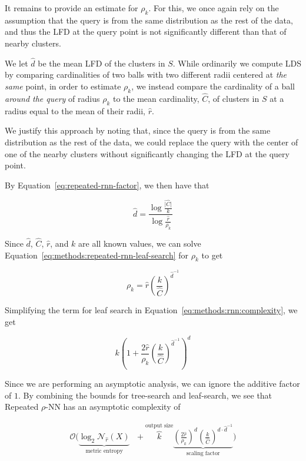 It remains to provide an estimate for $\rho_k$. 
For this, we once again rely on the assumption that the query is from the same distribution as the rest of the data, and thus the LFD at the query point is not significantly different than that of nearby clusters.

We let $\hat{d}$ be the mean LFD of the clusters in $S$.
While ordinarily we compute LDS by comparing cardinalities of two balls with two different radii centered at \emph{the same} point, in order to estimate $\rho_k$, we instead compare the cardinality of a ball \emph{around the query} of radius $\rho_k$ to the mean cardinality, $\hat{C}$, of clusters in $S$ at a radius equal to the mean of their radii, $\hat{r}$.

We justify this approach by noting that, since the query is from the same distribution as the rest of the data, we could replace the query with the center of one of the nearby clusters without significantly changing the LFD at the query point.

By Equation~\ref{eq:repeated-rnn-factor}, we then have that

\begin{equation*}
    \hat{d} = \frac{\log{}\frac{\hat{|C|}}{k}}{\log{}\frac{\hat{r}}{\rho_k}}
\end{equation*}

Since $\hat{d}$, $\hat{C}$, $\hat{r}$, and $k$ are all known values, we can solve Equation~\ref{eq:methods:repeated-rnn-leaf-search} for $\rho_k$ to get

\begin{equation*}
    \rho_k = \hat{r} \left( \frac{k}{\hat{C}} \right)^{\hat{d}^{-1}}
\end{equation*}

Simplifying the term for leaf search in Equation~\ref{eq:methods:rnn:complexity}, we get

\begin{equation*}
    k \left( 1+ \frac{2\hat{r}}{\rho_k} \left( \frac{k}{\hat{C}} \right) ^ {\hat{d}^{-1}} \right)^d
\end{equation*}

Since we are performing an asymptotic analysis, we can ignore the additive factor of $1$.
By combining the bounds for tree-search and leaf-search, we see that Repeated $\rho$-NN has an asymptotic complexity of

\begin{gather}
    \mathcal{O}
    \Bigg(
        \underbrace{\log_2{\mathcal{N}_{\hat{r}}(X)}}_{\textrm{metric entropy}} \ \ \ + 
        \overbrace{k}^{\textrm{output size}}
        \underbrace{
            \left( \frac{2\hat{r}}{\rho_k} \right) ^ d \left( \frac{k}{\hat{C}} \right) ^ {d \cdot \hat{d}^{-1}}
        }_{\textrm{scaling factor}}
    \Bigg)
    \label{eq:methods:knn-by-rnn-complexity}
\end{gather}

